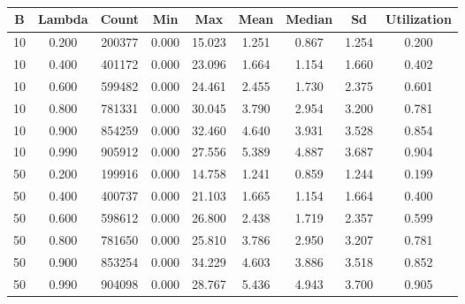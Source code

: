 \documentclass{article}
\begin{document}
\section{}

\section{}
\begin{tabular}{c | c | c | c | c | c | c | c | c}
	B & Lambda & Count & Min & Max & Mean & Median & Sd & Utilization \\
	\hline
	10 & 0.200 & 200377 & 0.000 & 15.023 & 1.251 & 0.867 & 1.254 & 0.200 \\   
	10 & 0.400 & 401172 & 0.000 & 23.096 & 1.664 & 1.154 & 1.660 & 0.402 \\
	10 & 0.600 & 599482 & 0.000 & 24.461 & 2.455 & 1.730 & 2.375 & 0.601 \\    
	10 & 0.800 & 781331 & 0.000 & 30.045 & 3.790 & 2.954 & 3.200 & 0.781 \\    
	10 & 0.900 & 854259 & 0.000 & 32.460 & 4.640 & 3.931 & 3.528 & 0.854 \\    
	10 & 0.990 & 905912 & 0.000 & 27.556 & 5.389 & 4.887 & 3.687 & 0.904 \\    
	50 & 0.200 & 199916 & 0.000 & 14.758 & 1.241 & 0.859 & 1.244 & 0.199 \\    
	50 & 0.400 & 400737 & 0.000 & 21.103 & 1.665 & 1.154 & 1.664 & 0.400 \\    
	50 & 0.600 & 598612 & 0.000 & 26.800 & 2.438 & 1.719 & 2.357 & 0.599 \\    
	50 & 0.800 & 781650 & 0.000 & 25.810 & 3.786 & 2.950 & 3.207 & 0.781 \\    
	50 & 0.900 & 853254 & 0.000 & 34.229 & 4.603 & 3.886 & 3.518 & 0.852 \\    
	50 & 0.990 & 904098 & 0.000 & 28.767 & 5.436 & 4.943 & 3.700 & 0.905 \\  
\end{tabular} \\

\section{}

\part{}	
	
\section{}

\section{}
\end{document}
